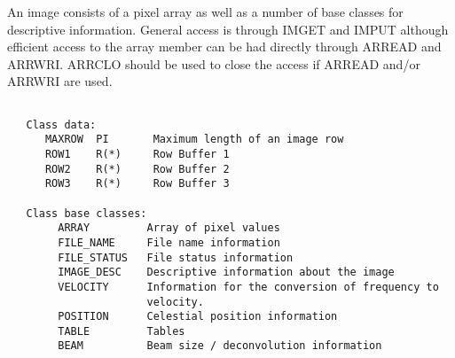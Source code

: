 An image consists of a pixel array as well as a number of base
classes for descriptive information.  General access is through
IMGET and IMPUT although efficient access to the array member can be
had directly through ARREAD and ARRWRI.   ARRCLO should be used to
close the access if ARREAD and/or ARRWRI are used.
{\small\begin{verbatim}

   Class data:
      MAXROW  PI       Maximum length of an image row
      ROW1    R(*)     Row Buffer 1
      ROW2    R(*)     Row Buffer 2
      ROW3    R(*)     Row Buffer 3

   Class base classes:
        ARRAY         Array of pixel values
        FILE_NAME     File name information
        FILE_STATUS   File status information
        IMAGE_DESC    Descriptive information about the image
        VELOCITY      Information for the conversion of frequency to
                      velocity.
        POSITION      Celestial position information
        TABLE         Tables
        BEAM          Beam size / deconvolution information


\end{verbatim}}
